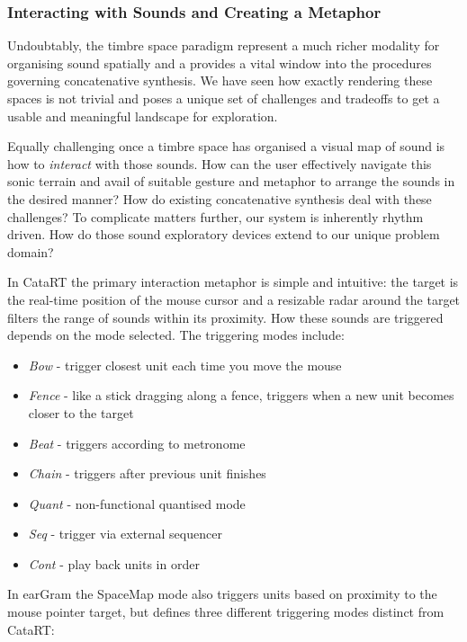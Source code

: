 \subsubsection{Interacting with Sounds and Creating a Metaphor}

Undoubtably, the timbre space paradigm represent a much richer modality for organising sound spatially and a provides a vital window into the procedures governing concatenative synthesis. We have seen how exactly rendering these spaces is not trivial and poses a unique set of challenges and tradeoffs to get a usable and meaningful landscape for exploration.

Equally challenging once a timbre space has organised a visual map of sound is how to \textit{interact} with those sounds. How can the user effectively navigate this sonic terrain and avail of suitable gesture and metaphor to arrange the sounds in the desired manner? How do existing concatenative synthesis deal with these challenges? To complicate matters further, our system is inherently rhythm driven. How do those sound exploratory devices extend to our unique problem domain?

In CataRT the primary interaction metaphor is simple and intuitive: the target is the real-time position of the mouse cursor and a resizable radar around the target filters the range of sounds within its proximity. How these sounds are triggered depends on the mode selected. The triggering modes include:

\begin{itemize}
  \item \textit{Bow} - trigger closest unit each time you move the mouse
  \item \textit{Fence} - like a stick dragging along a fence, triggers when a new unit becomes closer to the target
  \item \textit{Beat} - triggers according to metronome
  \item \textit{Chain} - triggers after previous unit finishes
  \item \textit{Quant} - non-functional quantised mode
  \item \textit{Seq} - trigger via external sequencer
  \item \textit{Cont} - play back units in order
\end{itemize}

In earGram the SpaceMap mode also triggers units based on proximity to the mouse pointer target, but defines three different triggering modes distinct from CataRT:

